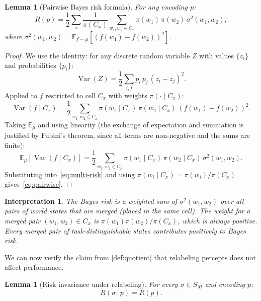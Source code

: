 \documentclass[12pt]{article}
\newtheorem{lemma}[theorem]{Lemma}
\newtheorem*{interpretation}{Interpretation}
\newcommand{\sigmasq}{\sigma^2}
\newcommand{\E}{\mathbb{E}}
\newcommand{\Var}{\operatorname{Var}}
\newcommand{\SM}{S_M}
\begin{document}
\begin{lemma}[Pairwise Bayes risk formula]\label{lem:pairwise}
For any encoding $p$:
\begin{equation}\label{eq:pairwise}
R(p) = \frac{1}{2} \sum_x \frac{1}{\pi(C_x)} \sum_{w_1, w_2 \in C_x} \pi(w_1)\, \pi(w_2)\, \sigmasq(w_1, w_2),
\end{equation}
where $\sigmasq(w_1, w_2) = \E_{f \sim \mu}[(f(w_1) - f(w_2))^2]$.
\end{lemma}

\begin{proof}
We use the identity: for any discrete random variable $Z$ with values $\{z_i\}$ and probabilities $\{p_i\}$:
\begin{equation}\label{eq:var-pairwise-identity}
\Var(Z) = \frac{1}{2} \sum_{i,j} p_i\, p_j\, (z_i - z_j)^2.
\end{equation}
Applied to $f$ restricted to cell $C_x$ with weights $\pi(\cdot \mid C_x)$:
\[
\Var(f \mid C_x) = \frac{1}{2} \sum_{w_1, w_2 \in C_x} \pi(w_1 \mid C_x)\, \pi(w_2 \mid C_x)\, (f(w_1) - f(w_2))^2.
\]
Taking $\E_\mu$ and using linearity (the exchange of expectation and summation is justified by Fubini's theorem, since all terms are non-negative and the sums are finite):
\[
\E_\mu[\Var(f \mid C_x)] = \frac{1}{2} \sum_{w_1, w_2 \in C_x} \pi(w_1 \mid C_x)\, \pi(w_2 \mid C_x)\, \sigmasq(w_1, w_2).
\]
Substituting into~\eqref{eq:multi-risk} and using $\pi(w_i \mid C_x) = \pi(w_i)/\pi(C_x)$ gives~\eqref{eq:pairwise}.
\end{proof}

\begin{interpretation}
The Bayes risk is a weighted sum of $\sigmasq(w_1, w_2)$ over all pairs of world states that are \emph{merged} (placed in the same cell). The weight for a merged pair $(w_1, w_2) \in C_x$ is $\pi(w_1)\pi(w_2)/\pi(C_x)$, which is always positive. Every merged pair of task-distinguishable states contributes positively to Bayes risk.
\end{interpretation}

We can now verify the claim from \cref{def:quotient} that relabeling percepts does not affect performance.

\begin{lemma}[Risk invariance under relabeling]\label{lem:risk-invariance}
For every $\sigma \in \SM$ and encoding $p$:
\begin{equation}
R(\sigma \cdot p) = R(p).
\end{equation}
\end{lemma}
\end{document}
